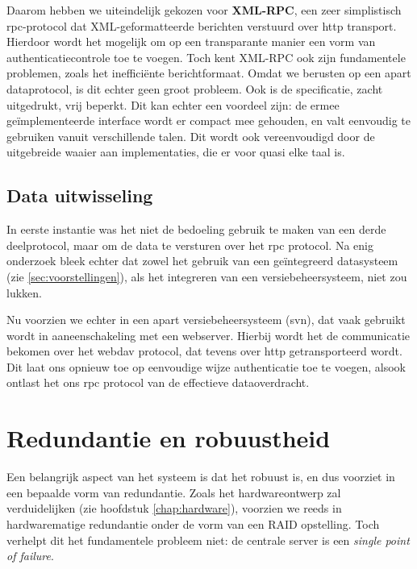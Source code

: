 Daarom hebben we uiteindelijk gekozen voor \textbf{XML-RPC}, een zeer simplistisch \ac{rpc}-protocol dat XML-geformatteerde berichten verstuurd over \ac{http} transport. Hierdoor wordt het mogelijk om op een transparante manier een vorm van authenticatiecontrole toe te voegen. Toch kent XML-RPC ook zijn fundamentele problemen, zoals het inefficiënte berichtformaat. Omdat we berusten op een apart dataprotocol, is dit echter geen groot probleem. Ook is de specificatie, zacht uitgedrukt, vrij beperkt. Dit kan echter een voordeel zijn: de ermee geïmplementeerde interface wordt er compact mee gehouden, en valt eenvoudig te gebruiken vanuit verschillende talen. Dit wordt ook vereenvoudigd door de uitgebreide waaier aan implementaties, die er voor quasi elke taal is.

\subsection{Data uitwisseling}

In eerste instantie was het niet de bedoeling gebruik te maken van een derde deelprotocol, maar om de data te versturen over het \ac{rpc} protocol. Na enig onderzoek bleek echter dat zowel het gebruik van een geïntegreerd datasysteem (zie \ref{sec:voorstellingen}), als het integreren van een versiebeheersysteem, niet zou lukken.

Nu voorzien we echter in een apart versiebeheersysteem (\ac{svn}), dat vaak gebruikt wordt in aaneenschakeling met een webserver. Hierbij wordt het de communicatie bekomen over het \ac{webdav} protocol, dat tevens over \ac{http} getransporteerd wordt. Dit laat ons opnieuw toe op eenvoudige wijze authenticatie toe te voegen, alsook ontlast het ons \ac{rpc} protocol van de effectieve dataoverdracht.

\section{Redundantie en robuustheid}
\label{sec:redundantie}

Een belangrijk aspect van het systeem is dat het robuust is, en dus voorziet in een bepaalde vorm van redundantie. Zoals het hardwareontwerp zal verduidelijken (zie hoofdstuk \ref{chap:hardware}), voorzien we reeds in hardwarematige redundantie onder de vorm van een RAID opstelling. Toch verhelpt dit het fundamentele probleem niet: de centrale server is een \emph{single point of failure}.

